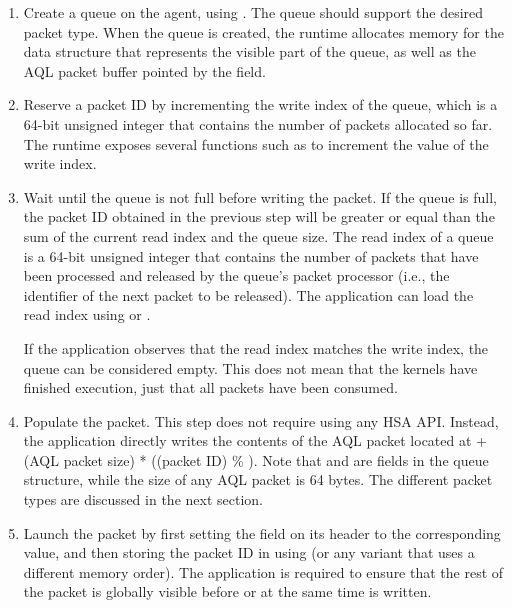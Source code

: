 \documentclass[final]{book}
\begin{document}
\begin{enumerate}[itemsep=1pt,topsep=3pt,partopsep=0pt]

\item Create a queue on the agent, using . The queue
  should support the desired packet type. When the queue is created, the runtime
  allocates memory for the  data structure that represents
  the visible part of the queue, as well as the AQL packet buffer pointed by the
   field.

\item Reserve a packet ID by incrementing the write index of the queue, which is
  a 64-bit unsigned integer that contains the number of packets allocated so
  far. The runtime exposes several functions such as
   to increment the value of the write
  index.

\item Wait until the queue is not full before writing the packet.  If the queue
  is full, the packet ID obtained in the previous step will be greater or equal
  than the sum of the current read index and the queue size. The read index of a
  queue is a 64-bit unsigned integer that contains the number of packets that
  have been processed and released by the queue's packet processor (i.e., the
  identifier of the next packet to be released). The application can load the
  read index using  or
  .

  If the application observes that the read index matches the write index, the
  queue can be considered empty. This does not mean that the kernels have
  finished execution, just that all packets have been consumed.

\item Populate the packet. This step does not require using any HSA
  API. Instead, the application directly writes the contents of the AQL packet
  located at  + (AQL packet size) * ((packet
  ID) \% ). Note that 
  and  are fields in the queue structure, while the
  size of any AQL packet is 64 bytes. The different packet types are discussed
  in the next section.

\item Launch the packet by first setting the 
  field on its header to the corresponding value, and then storing the packet ID
  in  using
   (or any variant that uses a different memory
  order). The application is required to ensure that the rest of the packet is
  globally visible before or at the same time 
  is written.


\end{enumerate}
\end{document}
